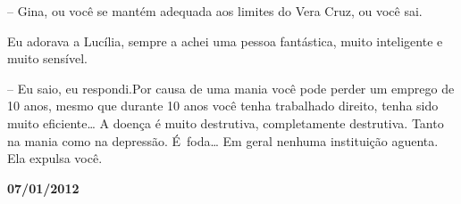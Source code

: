 -- Gina, ou você se mantém adequada aos limites do Vera Cruz, ou você
sai.

Eu adorava a Lucília, sempre a achei uma pessoa fantástica, muito
inteligente e muito sensível.

-- Eu saio, eu respondi.Por causa de uma mania você pode perder um
emprego de 10 anos, mesmo que durante 10 anos você tenha trabalhado
direito, tenha sido muito eficiente… A doença é muito destrutiva,
completamente destrutiva. Tanto na mania como na depressão. É~foda… Em geral nenhuma instituição aguenta. Ela expulsa você.

\begin{center}\asterisc{}\textbf{}\end{center}

\begin{flushright}\textbf{07/01/2012}\end{flushright}


